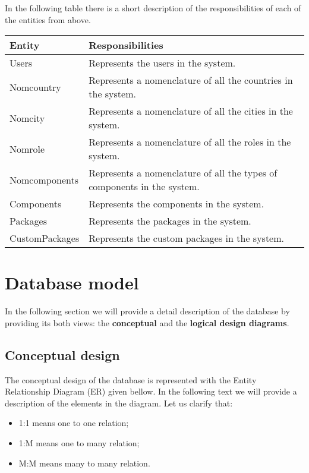 \documentclass[a4paper,12pt]{book}
\begin{document}
In the following table there is a short description of the responsibilities of each of the entities from above.

\begin{center}
  \begin{tabular}{ | p{3cm} | p{12cm} | }
    \hline
    \textbf{Entity} & \textbf{Responsibilities} \\ \hline
    Users & Represents the users in the system. \\ \hline
    Nomcountry & Represents a nomenclature of all the countries in the system. \\ \hline
    Nomcity & Represents a nomenclature of all the cities in the system. \\ \hline
    Nomrole & Represents a nomenclature of all the roles in the system. \\ \hline
    Nomcomponents & Represents a nomenclature of all the types of components in the system. \\ \hline
    Components & Represents the components in the system. \\ \hline
    Packages & Represents the packages in the system. \\ \hline
    CustomPackages & Represents the custom packages in the system. \\ \hline
  \end{tabular}
\end{center}

\section{Database model}
In the following section we will provide a detail description of the database by providing its both views: the \textbf{conceptual} and the \textbf{logical design diagrams}.

\subsection{Conceptual design}
The conceptual design of the database is represented with the Entity Relationship Diagram (ER) given bellow. In the following text we will provide a description of the elements in the diagram. Let us clarify that:
\begin{itemize}
  \item 1:1 means one to one relation;
  \item 1:M means one to many relation;
  \item M:M means many to many relation.
\end{itemize}
\end{document}
